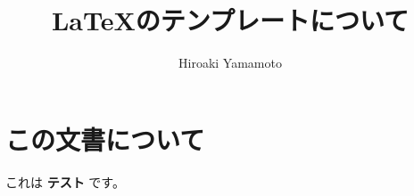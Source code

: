 

\usepackage{lipsum} %

\author{Hiroaki Yamamoto}
\title{\LaTeX のテンプレートについて}


  \nocite{*}
  \cfoot{\thepage}
  \maketitle

\begin{sloppypar}
  \section{この文書について}
    これは {\bf テスト} です。
    \lipsum
\end{sloppypar}




